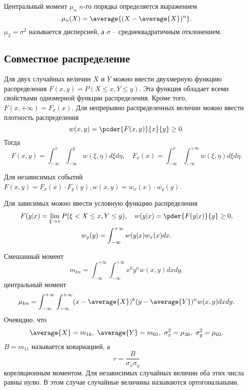 Центральный момент \( \mu_n \) \( n \)-го порядка определяется выражением
\[
    \mu_n(X) = \average{(X - \average{X})^n}.
\]
\( \mu_2 = \sigma^2 \) называется дисперсией, а \( \sigma \) --
среднеквадратичным отклонением.

\subsection{Совместное распределение}
Для двух случайных величин \( X \) и \( Y \) можно ввести двухмерную функцию
распределения \( F(x,y) = P(X \le x, Y \le y) \). Эта функция обладает всеми
свойствами одномерной функции распределения. Кроме того,
\( F(x, +\infty) = F_x(x) \). Для непрерывно распределенных величин можно ввести
плотность распределения
\[
    w(x,y) = \pcder{F(x,y)}{x}{y} \ge 0.
\]
Тогда
\[
    F(x, y) = \int_{-\infty}^x\int_{-\infty}^y w(\xi,\eta)d\xi d\eta,\quad
    F_x(x) = \int_{-\infty}^x\int_{-\infty}^{+\infty} w(\xi,\eta)d\xi d\eta.
\]

Для независимых событий
\( F(x,y) = F_x(x) \cdot F_y(y), w(x,y) = w_x(x) \cdot w_y(y) \).

Для зависимых можно ввести условную функцию распределения
\begin{gather*}
    F(y|x) = \lim_{\xi \to x} P(\xi < X \le x, Y \le y),\quad
    w(y|x) = \pder{F(y|x)}{y} \ge 0,\\
    w_y(y) = \int_{-\infty}^{+\infty} w(y|x) w_x(x) dx.
\end{gather*}

Смешанный момент
\[
    m_{kn} = \int_{-\infty}^{+\infty}\int_{-\infty}^{+\infty}x^ky^nw(x,y)dxdy,
\]
центральный момент
\[
    \mu_{kn} = \int_{-\infty}^{+\infty}\int_{-\infty}^{+\infty}
        (x-\average{X})^k(y-\average{Y})^nw(x,y)dxdy.
\]
Очевидно, что
\[
    \average{X} = m_{10},\ \average{Y} = m_{01},\ \sigma_x^2 = \mu_{20},
    \ \sigma_y^2 = \mu_{02}.
\]
\( B = m_{11} \) называется ковариацией, а
\[
    r = \frac{B}{\sigma_x\sigma_y}
\]
кореляционным моментом. Для независимых случайных величин оба этих числа равны
нулю. В этом случае случайные величины называются ортогональными.
